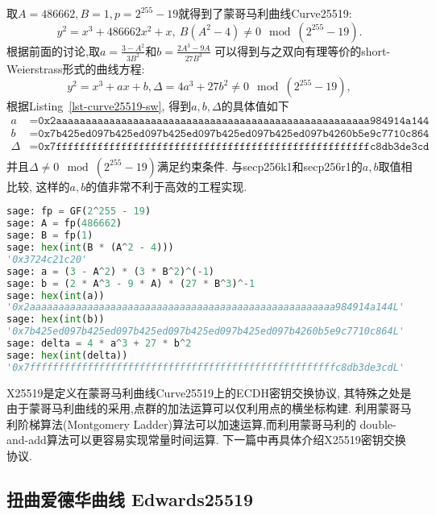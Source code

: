 取$A = 486662, B = 1, p = 2^{255}-19$就得到了蒙哥马利曲线Curve25519:
$$
y^2 = x^3 + 486662x^2 + x,\  B(A^2-4)\neq 0 \mod (2^{255}-19).
$$
根据前面的讨论,取$a = \frac{3-A^2}{3B^2}$和$b = \frac{2A^3 - 9A}{27B^3}$
可以得到与之双向有理等价的short-Weierstrass形式的曲线方程:
$$
y^2 = x^3 + ax + b, \Delta = 4a^3 + 27b^2 \neq 0\mod (2^{255}-19),
$$
根据Listing~\ref{lst-curve25519-sw}, 得到$a,b,\Delta$的具体值如下
\begin{equation*}
\begin{array}{rl}
a & = \texttt{0x2aaaaaaaaaaaaaaaaaaaaaaaaaaaaaaaaaaaaaaaaaaaaaaaaaaaaa984914a144} \\
b & = \texttt{0x7b425ed097b425ed097b425ed097b425ed097b425ed097b4260b5e9c7710c864} \\
\Delta &= \texttt{0x7fffffffffffffffffffffffffffffffffffffffffffffffffffffc8db3de3cd}\\
\end{array}
\end{equation*}
并且$\Delta\neq 0\mod (2^{255}-19)$满足约束条件.
与secp256k1和secp256r1的$a,b$取值相比较, 这样的$a,b$的值非常不利于高效的工程实现.

\begin{lstlisting}[language = python, caption = Curve25519曲线的short-Weierstrass形式的曲线参数,label=lst-curve25519-sw]
sage: fp = GF(2^255 - 19)
sage: A = fp(486662)
sage: B = fp(1)
sage: hex(int(B * (A^2 - 4)))
'0x3724c21c20'
sage: a = (3 - A^2) * (3 * B^2)^(-1)
sage: b = (2 * A^3 - 9 * A) * (27 * B^3)^-1
sage: hex(int(a))
'0x2aaaaaaaaaaaaaaaaaaaaaaaaaaaaaaaaaaaaaaaaaaaaaaaaaaaaa984914a144L'
sage: hex(int(b))
'0x7b425ed097b425ed097b425ed097b425ed097b425ed097b4260b5e9c7710c864L'
sage: delta = 4 * a^3 + 27 * b^2
sage: hex(int(delta))
'0x7fffffffffffffffffffffffffffffffffffffffffffffffffffffc8db3de3cdL'
\end{lstlisting}

X25519是定义在蒙哥马利曲线Curve25519上的ECDH密钥交换协议,
其特殊之处是由于蒙哥马利曲线的采用,点群的加法运算可以仅利用点的横坐标构建.
利用蒙哥马利阶梯算法(Montgomery Ladder)算法可以加速运算,而利用蒙哥马利的
double-and-add算法可以更容易实现常量时间运算.
下一篇中再具体介绍X25519密钥交换协议.

\subsection{扭曲爱德华曲线 Edwards25519}

